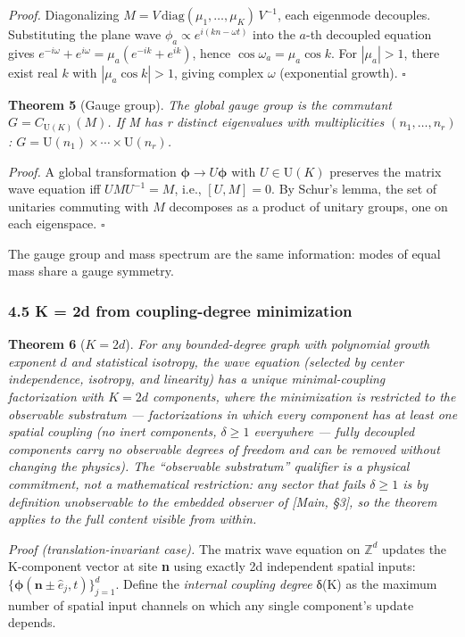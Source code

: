 \documentclass[
]{article}
\begin{document}
\emph{Proof.} Diagonalizing
\(M = V\,\text{diag}(\mu_1, \ldots, \mu_K)\,V^{-1}\), each eigenmode
decouples. Substituting the plane wave
\(\phi_a \propto e^{i(kn - \omega t)}\) into the \(a\)-th decoupled
equation gives \(e^{-i\omega} + e^{i\omega} = \mu_a(e^{-ik} + e^{ik})\),
hence \(\cos\omega_a = \mu_a \cos k\). For \(|\mu_a| > 1\), there exist
real \(k\) with \(|\mu_a \cos k| > 1\), giving complex \(\omega\)
(exponential growth). \(\square\)

\textbf{Theorem 5} (Gauge group). \emph{The global gauge group is the
commutant \(G = C_{\mathrm{U}(K)}(M)\). If M has r distinct eigenvalues
with multiplicities \((n_1, \ldots, n_r)\):
\(G = \mathrm{U}(n_1) \times \cdots \times \mathrm{U}(n_r)\).}

\emph{Proof.} A global transformation
\(\boldsymbol{\phi} \to U\boldsymbol{\phi}\) with
\(U \in \mathrm{U}(K)\) preserves the matrix wave equation iff
\(UMU^{-1} = M\), i.e., \([U, M] = 0\). By Schur's lemma, the set of
unitaries commuting with \(M\) decomposes as a product of unitary
groups, one on each eigenspace. \(\square\)

The gauge group and mass spectrum are the same information: modes of
equal mass share a gauge symmetry.

\hypertarget{k-2d-from-coupling-degree-minimization}{%
\subsubsection{4.5 K = 2d from coupling-degree
minimization}\label{k-2d-from-coupling-degree-minimization}}

\textbf{Theorem 6} (\(K = 2d\)). \emph{For any bounded-degree graph with
polynomial growth exponent \(d\) and statistical isotropy, the wave
equation (selected by center independence, isotropy, and linearity) has
a unique minimal-coupling factorization with \(K = 2d\) components,
where the minimization is restricted to the observable substratum ---
factorizations in which every component has at least one spatial
coupling (no inert components, \(\delta \geq 1\) everywhere --- fully
decoupled components carry no observable degrees of freedom and can be
removed without changing the physics). The ``observable substratum''
qualifier is a physical commitment, not a mathematical restriction: any
sector that fails \(\delta \geq 1\) is by definition unobservable to the
embedded observer of {[}Main, §3{]}, so the theorem applies to the full
content visible from within.}

\emph{Proof (translation-invariant case).} The matrix wave equation on
\(\mathbb{Z}^d\) updates the K-component vector at site \textbf{n} using
exactly 2d independent spatial inputs:
\(\{\boldsymbol{\phi}(\mathbf{n} \pm \hat{e}_j, t)\}_{j=1}^d\). Define
the \emph{internal coupling degree} δ(K) as the maximum number of
spatial input channels on which any single component's update depends.
\end{document}

